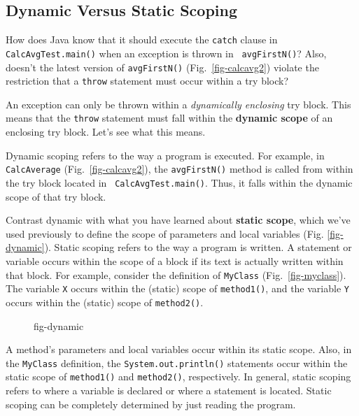 

\subsection{Dynamic Versus Static Scoping}
\noindent How does Java know that it should execute the {\tt catch} clause in
{\tt CalcAvg\-Test.main()} when an exception is thrown in {\tt
avgFirstN()}?  Also, doesn't the latest version of {\tt avgFirstN()}
(Fig.~\ref{fig-calcavg2}) violate the restriction that a {\tt throw}
statement must occur within a try block?

An exception can only be thrown within a {\it dynamically enclosing}
try block.  This means that the {\tt throw} statement must fall within
the {\bf dynamic scope} of an enclosing try block.  Let's see what
this means.

Dynamic scoping refers to the way a program is executed.  For example,
in {\tt CalcAverage} (Fig.~\ref{fig-calcavg2}), the {\tt avgFirstN()}
method is called from within the try block located in {\tt
CalcAvgTest.main()}.  Thus, it falls within the dynamic scope of that
try block.

Contrast dynamic with what you have learned about {\bf static scope}, which
we've used previously to define the scope of parameters and local
variables (Fig. \ref{fig-dynamic}).  Static scoping refers to the
way a program is written.  A statement or variable occurs within the
scope of a block if its text is actually written within that block.
For example, consider the definition of {\tt MyClass}
(Fig.~\ref{fig-myclass}). The variable {\tt X} occurs within the
(static) scope of {\tt method1()}, and the variable {\tt Y} occurs
within the (static) scope of {\tt method2()}.
\begin{figure}[h]
{fig-dynamic}
\end{figure}


A method's parameters and local variables occur within its static
scope.  Also, in the {\tt MyClass} definition, the
{\tt System.out.println()} statements occur within the static scope of
{\tt method1()} and {\tt method2()}, respectively.   In general, static
scoping refers to where a variable is declared or where a statement is
located.  Static scoping can be completely determined by just reading
the program.


